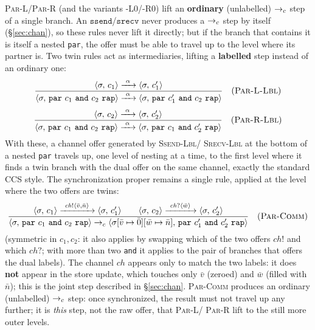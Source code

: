 \medskip
\noindent
\textsc{Par-L}/\textsc{Par-R} (and the variants \textsc{-L0}/\textsc{-R0})
lift an \textbf{ordinary} (unlabelled) $\to_c$ step of a single
branch. An $\mathtt{ssend}$/$\mathtt{srecv}$ never produces a $\to_c$ step by
itself (\S\ref{sec:chan}), so these rules never lift it
directly; but if the branch that contains it is itself a nested \texttt{par},
the offer must be able to travel up to the level where its
partner is. Two twin rules act as intermediaries, lifting a \textbf{labelled}
step instead of an ordinary one:
\[
\dfrac{\cfg{c_1}{\sigma} \xrightarrow{\ \alpha\ } \cfg{c_1'}{\sigma}}
      {\cfg{\mathtt{par}\ c_1\ \mathtt{and}\ c_2\ \mathtt{rap}}{\sigma}
       \xrightarrow{\ \alpha\ } \cfg{\mathtt{par}\ c_1'\ \mathtt{and}\ c_2\ \mathtt{rap}}{\sigma}} \rname{Par-L-Lbl}
\]
\[
\dfrac{\cfg{c_2}{\sigma} \xrightarrow{\ \alpha\ } \cfg{c_2'}{\sigma}}
      {\cfg{\mathtt{par}\ c_1\ \mathtt{and}\ c_2\ \mathtt{rap}}{\sigma}
       \xrightarrow{\ \alpha\ } \cfg{\mathtt{par}\ c_1\ \mathtt{and}\ c_2'\ \mathtt{rap}}{\sigma}} \rname{Par-R-Lbl}
\]
With these, a channel offer generated by \textsc{Ssend-Lbl}/
\textsc{Srecv-Lbl} at the bottom of a nested \texttt{par} travels up, one level of
nesting at a time, to the first level where it finds a twin branch with
the dual offer on the same channel, exactly the standard CCS
style. The synchronization proper remains a single rule, applied at the
level where the two offers are twins:
\[
\dfrac{\cfg{c_1}{\sigma} \xrightarrow{\ \mathit{ch}!\langle \bar v,\bar n\rangle\ } \cfg{c_1'}{\sigma}
       \qquad
       \cfg{c_2}{\sigma} \xrightarrow{\ \mathit{ch}?\langle \bar w\rangle\ } \cfg{c_2'}{\sigma}}
      {\cfg{\mathtt{par}\ c_1\ \mathtt{and}\ c_2\ \mathtt{rap}}{\sigma} \toc
       \cfg{\mathtt{par}\ c_1'\ \mathtt{and}\ c_2'\ \mathtt{rap}}{\upd{\upd{\sigma}{\bar v}{\bar 0}}{\bar w}{\bar n}}}
      \rname{Par-Comm}
\]
(symmetric in $c_1,c_2$: it also applies by swapping which of the two offers
$\mathit{ch}!$ and which $\mathit{ch}?$; with more than two \texttt{and} it applies
to the pair of branches that offers the dual labels). The channel $\mathit{ch}$
appears only to match the two labels: it does \textbf{not} appear
in the store update, which touches only $\bar v$ (zeroed) and $\bar w$
(filled with $\bar n$); this is the joint step described in
\S\ref{sec:chan}. \textsc{Par-Comm} produces an ordinary (unlabelled) $\to_c$ step:
once synchronized, the result must not travel up
any further; it is \emph{this} step, not the raw offer, that \textsc{Par-L}/
\textsc{Par-R} lift to the still more outer levels.

